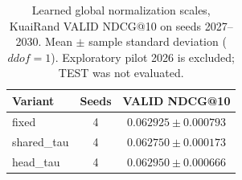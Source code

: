 \begin{table}[t]
\centering
\small
\caption{Learned global normalization scales, KuaiRand VALID NDCG@10 on seeds 2027--2030. Mean $\pm$ sample standard deviation ($ddof=1$). Exploratory pilot 2026 is excluded; TEST was not evaluated.}
\label{tab:head-timescales-valid}
\begin{tabular}{lcc}
\toprule
Variant & Seeds & VALID NDCG@10 \\
\midrule
fixed & 4 & $0.062925 \pm 0.000793$ \\
shared\_tau & 4 & $0.062750 \pm 0.000173$ \\
head\_tau & 4 & $0.062950 \pm 0.000666$ \\
\bottomrule
\end{tabular}
\end{table}
